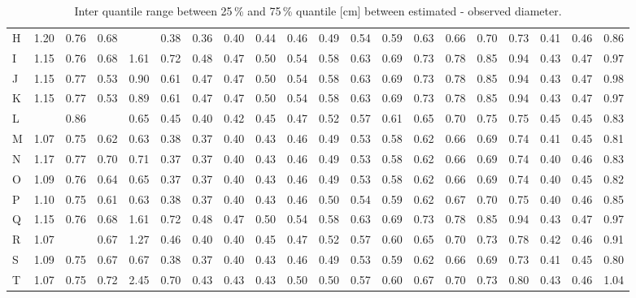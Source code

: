 \documentclass[twocolumn]{scrartcl}
\begin{document}
\begin{table*}[htbp]
\begin{adjustbox}{width=1.95\columnwidth}
\begin{tabular*}{\linewidth}{l |@{~~~} *{19}{S[detect-weight,mode=text,table-format=1.2]}}
H & 1.20 & 0.76 & 0.68 &  & 0.38 & 0.36 & 0.40 & 0.44 & 0.46 & 0.49 & 0.54 & 0.59 & 0.63 & 0.66 & 0.70 & 0.73 & 0.41 & 0.46 & 0.86 \\
I & 1.15 & 0.76 & 0.68 & 1.61 & 0.72 & 0.48 & 0.47 & 0.50 & 0.54 & 0.58 & 0.63 & 0.69 & 0.73 & 0.78 & 0.85 & 0.94 & 0.43 & 0.47 & 0.97 \\
J & 1.15 & 0.77 & 0.53 & 0.90 & 0.61 & 0.47 & 0.47 & 0.50 & 0.54 & 0.58 & 0.63 & 0.69 & 0.73 & 0.78 & 0.85 & 0.94 & 0.43 & 0.47 & 0.98 \\[.35em]
K & 1.15 & 0.77 & 0.53 & 0.89 & 0.61 & 0.47 & 0.47 & 0.50 & 0.54 & 0.58 & 0.63 & 0.69 & 0.73 & 0.78 & 0.85 & 0.94 & 0.43 & 0.47 & 0.97 \\
L &  & 0.86 &  & 0.65 & 0.45 & 0.40 & 0.42 & 0.45 & 0.47 & 0.52 & 0.57 & 0.61 & 0.65 & 0.70 & 0.75 & 0.75 & 0.45 & 0.45 & 0.83 \\
M & 1.07 & 0.75 & 0.62 & 0.63 & 0.38 & 0.37 & 0.40 & 0.43 & 0.46 & 0.49 & 0.53 & 0.58 & 0.62 & 0.66 & 0.69 & 0.74 & 0.41 & 0.45 & 0.81 \\
N & 1.17 & 0.77 & 0.70 & 0.71 & 0.37 & 0.37 & 0.40 & 0.43 & 0.46 & 0.49 & 0.53 & 0.58 & 0.62 & 0.66 & 0.69 & 0.74 & 0.40 & 0.46 & 0.83 \\
O & 1.09 & 0.76 & 0.64 & 0.65 & 0.37 & 0.37 & 0.40 & 0.43 & 0.46 & 0.49 & 0.53 & 0.58 & 0.62 & 0.66 & 0.69 & 0.74 & 0.40 & 0.45 & 0.82 \\[.35em]
P & 1.10 & 0.75 & 0.61 & 0.63 & 0.38 & 0.37 & 0.40 & 0.43 & 0.46 & 0.50 & 0.54 & 0.59 & 0.62 & 0.67 & 0.70 & 0.75 & 0.40 & 0.46 & 0.85 \\
Q & 1.15 & 0.76 & 0.68 & 1.61 & 0.72 & 0.48 & 0.47 & 0.50 & 0.54 & 0.58 & 0.63 & 0.69 & 0.73 & 0.78 & 0.85 & 0.94 & 0.43 & 0.47 & 0.97 \\
R & 1.07 &  & 0.67 & 1.27 & 0.46 & 0.40 & 0.40 & 0.45 & 0.47 & 0.52 & 0.57 & 0.60 & 0.65 & 0.70 & 0.73 & 0.78 & 0.42 & 0.46 & 0.91 \\
S & 1.09 & 0.75 & 0.67 & 0.67 & 0.38 & 0.37 & 0.40 & 0.43 & 0.46 & 0.49 & 0.53 & 0.59 & 0.62 & 0.66 & 0.69 & 0.73 & 0.41 & 0.45 & 0.80 \\
T & 1.07 & 0.75 & 0.72 & 2.45 & 0.70 & 0.43 & 0.43 & 0.43 & 0.50 & 0.50 & 0.57 & 0.60 & 0.67 & 0.70 & 0.73 & 0.80 & 0.43 & 0.46 & 1.04
  \end{tabular*}
\end{adjustbox}
\caption{Inter quantile range between 25\,\% and 75\,\% quantile [cm] between estimated - observed diameter.}
\label{tab:iqrInterpol}
\end{table*}
\end{document}
